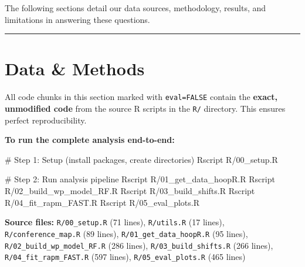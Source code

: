 \documentclass[
  letterpaper,
  DIV=11,
  numbers=noendperiod]{scrartcl}
\newenvironment{Shaded}{\begin{snugshade}}{\end{snugshade}}
\newcommand{\CommentTok}[1]{\textcolor[rgb]{0.37,0.37,0.37}{#1}}
\newcommand{\ExtensionTok}[1]{\textcolor[rgb]{0.00,0.23,0.31}{#1}}
\newcommand{\NormalTok}[1]{\textcolor[rgb]{0.00,0.23,0.31}{#1}}
\begin{document}
The following sections detail our data sources, methodology, results,
and limitations in answering these questions.

\begin{center}\rule{0.5\linewidth}{0.5pt}\end{center}

\section{Data \& Methods}\label{data-methods}

\begin{tcolorbox}[enhanced jigsaw, toprule=.15mm, opacitybacktitle=0.6, breakable, leftrule=.75mm, toptitle=1mm, rightrule=.15mm, left=2mm, coltitle=black, colbacktitle=quarto-callout-important-color!10!white, bottomtitle=1mm, bottomrule=.15mm, titlerule=0mm, colframe=quarto-callout-important-color-frame, title=\textcolor{quarto-callout-important-color}{\faExclamation}\hspace{0.5em}{Code Reproducibility}, arc=.35mm, colback=white, opacityback=0]

All code chunks in this section marked with \texttt{eval=FALSE} contain
the \textbf{exact, unmodified code} from the source R scripts in the
\texttt{R/} directory. This ensures perfect reproducibility.

\textbf{To run the complete analysis end-to-end:}

\begin{Shaded}
\begin{Highlighting}[]
\CommentTok{\# Step 1: Setup (install packages, create directories)}
\ExtensionTok{Rscript}\NormalTok{ R/00\_setup.R}

\CommentTok{\# Step 2: Run analysis pipeline}
\ExtensionTok{Rscript}\NormalTok{ R/01\_get\_data\_hoopR.R}
\ExtensionTok{Rscript}\NormalTok{ R/02\_build\_wp\_model\_RF.R  }
\ExtensionTok{Rscript}\NormalTok{ R/03\_build\_shifts.R}
\ExtensionTok{Rscript}\NormalTok{ R/04\_fit\_rapm\_FAST.R}
\ExtensionTok{Rscript}\NormalTok{ R/05\_eval\_plots.R}
\end{Highlighting}
\end{Shaded}

\textbf{Source files:} \texttt{R/00\_setup.R} (71 lines),
\texttt{R/utils.R} (17 lines), \texttt{R/conference\_map.R} (89 lines),
\texttt{R/01\_get\_data\_hoopR.R} (95 lines),
\texttt{R/02\_build\_wp\_model\_RF.R} (286 lines),
\texttt{R/03\_build\_shifts.R} (266 lines),
\texttt{R/04\_fit\_rapm\_FAST.R} (597 lines),
\texttt{R/05\_eval\_plots.R} (465 lines)

\end{tcolorbox}
\end{document}
